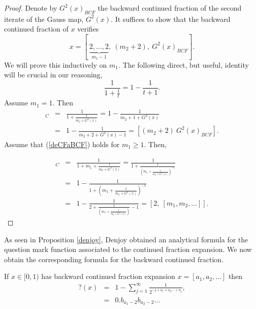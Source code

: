 \documentclass[letterpaper,10pt,reqno]{amsart}
\numberwithin{equation}{section}     %
\begin{document}
\begin{proof} Denote by $G^2(x)_{BCF}$ the backward continued fraction of the second iterate of the  Gauss map, $G^2(x)$. It suffices to show that the backward continued fraction of $x$ verifies
\[
x=[\ \underbrace{2,\dots, 2}_{m_1-1},\ (m_2+2),\ G^2(x)_{BCF}].
\]
We will prove this inductively on $m_1$. The following direct, but useful, identity will be crucial in our reasoning,
\[
\frac{1}{1+\frac{1}{t}}=1-\frac{1}{t+1}.
\]
Assume $m_1=1$. Then
\begin{eqnarray*}
[1, m_2,m_3, \dots]_C&=&\frac{1}{1+\frac{1}{m_2+G^2(x)}}=1-\frac{1}{m_2+1+G^2(x)}\\
&=&1-\frac{1}{m_2+2 +G^2(x)-1}
=[(m_2+2)\ G^2(x)_{BCF}].
\end{eqnarray*}
Assume that (\ref{deCFaBCF}) holds for $m_1\geq 1$. Then, 

\begin{eqnarray*}
 [(m_1+1),\ m_2, m_3,\dots]_C  &=& \frac{1}{1+m_1+\frac{1}{m_2+G^2(x)}}=\frac{1}{1+\frac{1}{\left(m_1+ \frac{1}{m_2+G^2(x)}\right)^{-1}}}   \\
&=&  1- \frac{1}{1+\left(m_1+\frac{1}{m_2+G^2(x)}\right)^{-1}}  \\
&=& 1-\frac{1}{2+\frac{1}{\left(m_1+\frac{1}{m_2 +G^2(x)}\right)}-1}  =  [2, \ [m_1, m_2, \dots]].
\end{eqnarray*}
\end{proof}
 

As seen in Proposition \ref{denjoy}, Denjoy obtained an analytical formula for the question mark function associated to the continued fraction expansion. We now obtain the corresponding formula for the backward continued fraction. 

\begin{proposition} \label{?-b}
If $x\in [0,1)$ has backward continued fraction expansion $x=[a_1, a_2, \dots]$ then
\begin{eqnarray*}
?(x)&=&1-\sum_{j=1}^{\infty}\frac{1}{2^{-j+a_1+a_2\dots+a_j}}, \\
&=&0.b_{a_1-2}b_{a_2-2}\dots
\end{eqnarray*}
\end{proposition}
\end{document}
